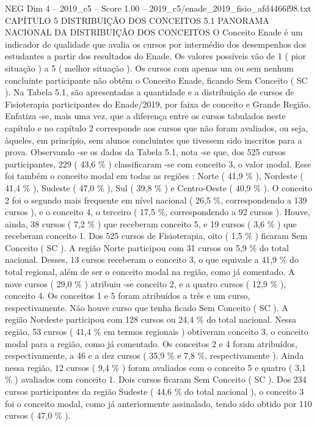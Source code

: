 \begin{textsample}{NEG Dim 4 – 2019\_c5 – Score 1.00 – 2019\_c5/enade\_2019\_fisio\_afd4466f98.txt}  \label{ex:f4_neg_163}
CAPÍTULO 5 DISTRIBUIÇÃO DOS CONCEITOS 5.1 PANORAMA NACIONAL DA DISTRIBUIÇÃO DOS CONCEITOS O Conceito Enade é um indicador de qualidade que avalia os cursos por intermédio dos desempenhos dos estudantes a partir dos resultados do Enade.
Os valores possíveis vão de 1 ( pior situação ) a 5 ( melhor situação ).
Os cursos com apenas um ou sem nenhum concluinte participante não obtêm o Conceito Enade, ficando Sem Conceito ( SC ).
Na Tabela 5.1, são apresentadas a quantidade e a distribuição de cursos de Fisioterapia participantes do Enade/2019, por faixa de conceito e Grande Região.
Enfatiza -se, mais uma vez, que a diferença entre os cursos tabulados neste capítulo e no capítulo 2 corresponde aos cursos que não foram avaliados, ou seja, àqueles, em princípio, sem alunos concluintes que tivessem sido inscritos para a prova.
Observando -se os dados da Tabela 5.1, nota -se que, dos 525 cursos participantes, 229 ( 43,6 \% ) classificaram -se com conceito 3, o valor modal.
Esse foi também o conceito modal em todas as regiões : Norte ( 41,9 \% ), Nordeste ( 41,4 \% ), Sudeste ( 47,0 \% ), Sul ( 39,8 \% ) e Centro-Oeste ( 40,9 \% ).
O conceito 2 foi o segundo mais frequente em nível nacional ( 26,5 \%, correspondendo a 139 cursos ), e o conceito 4, o terceiro ( 17,5 \%, correspondendo a 92 cursos ).
Houve, ainda, 38 cursos ( 7,2 \% ) que receberam conceito 5, e 19 cursos ( 3,6 \% ) que receberam conceito 1.
Dos 525 cursos de Fisioterapia, oito ( 1,5 \% ) ficaram Sem Conceito ( SC ).
A região Norte participou com 31 cursos ou 5,9 \% do total nacional.
Desses, 13 cursos receberam o conceito 3, o que equivale a 41,9 \% do total regional, além de ser o conceito modal na região, como já comentado.
A nove cursos ( 29,0 \% ) atribuiu -se conceito 2, e a quatro cursos ( 12,9 \% ), conceito 4.
Os conceitos 1 e 5 foram atribuídos a três e um curso, respectivamente.
Não houve curso que tenha ficado Sem Conceito ( SC ).
A região Nordeste participou com 128 cursos ou 24,4 \% do total nacional.
Nessa região, 53 cursos ( 41,4 \% em termos regionais ) obtiveram conceito 3, o conceito modal para a região, como já comentado.
Os conceitos 2 e 4 foram atribuídos, respectivamente, a 46 e a dez cursos ( 35,9 \% e 7,8 \%, respectivamente ).
Ainda nessa região, 12 cursos ( 9,4 \% ) foram avaliados com o conceito 5 e quatro ( 3,1 \% ) avaliados com conceito 1.
Dois cursos ficaram Sem Conceito ( SC ).
Dos 234 cursos participantes da região Sudeste ( 44,6 \% do total nacional ), o conceito 3 foi o conceito modal, como já anteriormente assinalado, tendo sido obtido por 110 cursos ( 47,0 \% ).

\end{textsample}
